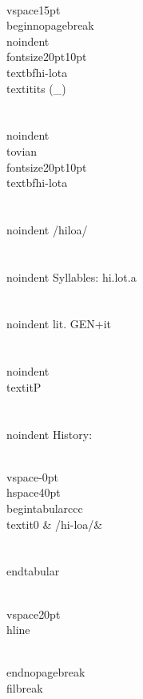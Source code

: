 \\vspace{15pt}
\\begin{nopagebreak}
\\noindent{\\fontsize{20pt}{10pt}\\textbf{hi-lota} } \\textit{its} (_)\\\\
\\noindent {\\tovian \\fontsize{20pt}{10pt} \\textbf{hi-lota} }\\\\
\\noindent /hil{\textprimstress}o{}a/\\\\
\\noindent Syllables: hi.lot.a\\\\
\\noindent lit. GEN+it\\\\
\\noindent \\textit{P}\\\\


\\noindent History:

\\vspace{-0pt}
\\hspace{40pt}
\\begin{tabular}{ccc}
\\textit{0} & /hi-lo{}a/& \\\\
\\end{tabular}

\\vspace{20pt}\\hline

\\end{nopagebreak}
\\filbreak



